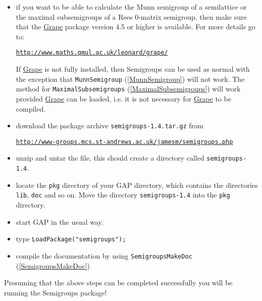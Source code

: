 \documentclass[a4paper,11pt]{report}
\begin{document}
{{\begin{itemize}
 \noindent Note that \href{ http://www-groups.mcs.st-and.ac.uk/~neunhoef/Computer/Software/Gap/orb.html } {Orb} and \textsf{Semigroups} both perform better if \href{ http://www-groups.mcs.st-and.ac.uk/~neunhoef/Computer/Software/Gap/orb.html } {Orb} is compiled. 
\item  if you want to be able to calculate the Munn semigroup of a semilattice or the
maximal subsemigroups of a Rees 0-matrix semigroup, then make sure that the \href{http://www.maths.qmul.ac.uk/~leonard/grape/} {Grape} package version 4.5 or higher is available. For more details go to:\vspace{\baselineskip}

\noindent \href{http://www.maths.qmul.ac.uk/~leonard/grape/} {\texttt{http://www.maths.qmul.ac.uk/\texttt{}leonard/grape/}}

 If \href{http://www.maths.qmul.ac.uk/~leonard/grape/} {Grape} is not fully installed, then \textsf{Semigroups} can be used as normal with the exception that \texttt{MunnSemigroup} (\ref{MunnSemigroup}) will not work. The method for \texttt{MaximalSubsemigroups} (\ref{MaximalSubsemigroups}) will work provided \href{http://www.maths.qmul.ac.uk/~leonard/grape/} {Grape} can be loaded, i.e. it is not necessary for \href{http://www.maths.qmul.ac.uk/~leonard/grape/} {Grape} to be compiled. 
\item  download the package archive \texttt{semigroups-1.4.tar.gz} from \vspace{\baselineskip}

\noindent\vspace{\baselineskip} \href{http://www-groups.mcs.st-andrews.ac.uk/~jamesm/semigroups.php} {\texttt{http://www-groups.mcs.st-andrews.ac.uk/\texttt{}jamesm/semigroups.php}} 
\item  unzip and untar the file, this should create a directory called \texttt{semigroups-1.4}.
\item  locate the \texttt{pkg} directory of your \textsf{GAP} directory, which contains the directories \texttt{lib}, \texttt{doc} and so on. Move the directory \texttt{semigroups-1.4} into the \texttt{pkg} directory. 
\item  start \textsf{GAP} in the usual way.
\item  type \texttt{LoadPackage("semigroups");}
\item  compile the documentation by using \texttt{SemigroupsMakeDoc} (\ref{SemigroupsMakeDoc}) 
\end{itemize}
  Presuming that the above steps can be completed successfully you will be
running the \textsf{Semigroups} package!

}}
\end{document}
